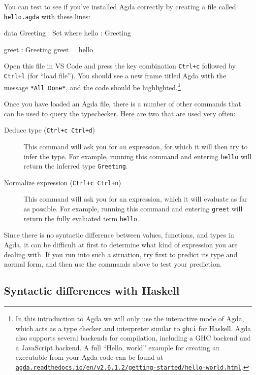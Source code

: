 \documentclass[a4paper,UKenglish]{tufte-handout}
\newcommand{\hrefu}[2]{\href{#1}{\nolinkurl{#2}}}
\theoremstyle{definition}
\begin{document}
You can test to see if you’ve installed Agda correctly by creating a file
called \texttt{hello.agda} with these lines:

\begin{code}[number]
data Greeting : Set where
  hello : Greeting

greet : Greeting
greet = hello
\end{code}
Open this file in VS Code and press the key combination
\texttt{Ctrl+c} followed by \texttt{Ctrl+l} (for ``load file''). You
should see a new frame titled Agda with the message \texttt{*All
Done*}, and the code should be highlighted.\footnote{In this
introduction to Agda we will only use the interactive mode of Agda,
which acts as a type checker and interpreter similar to \texttt{ghci}
for Haskell. Agda also supports several backends for compilation,
including a GHC backend and a JavaScript backend. A full ``Hello,
world'' example for creating an executable from your Agda code can be
found at
\hrefu{https://agda.readthedocs.io/en/v2.6.1.2/getting-started/hello-world.html}{agda.readthedocs.io/en/v2.6.1.2/getting-started/hello-world.html}.}

Once you have loaded an Agda file, there is a number of other commands that
can be used to query the typechecker. Here are two that are used very often:

\begin{description}
\item[Deduce type (\texttt{Ctrl+c Ctrl+d})] This command will ask you
  for an expression, for which it will then try to infer the type. For
  example, running this command and entering \texttt{hello} will
  return the inferred type \texttt{Greeting}.
\item[Normalize expression (\texttt{Ctrl+c Ctrl+n})] This command will ask you
  for an expression, which it will evaluate as far as possible. For
  example, running this command and entering \texttt{greet} will
  return the fully evaluated term \texttt{hello}. 
\end{description}

Since there is no syntactic difference between values, functions, and types in
Agda, it can be difficult at first to determine what kind of expression you are
dealing with. If you run into such a situation, try first to predict its type
and normal form, and then use the commands above to test your prediction.

\subsection{Syntactic differences with Haskell}
\end{document}
